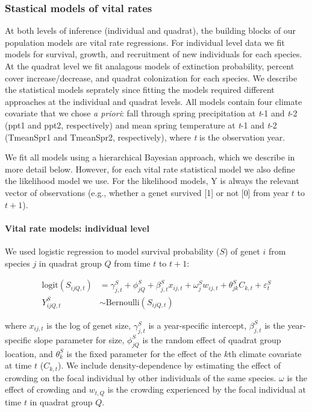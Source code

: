 \documentclass[12pt,]{article}
\begin{document}
\subsubsection{Stastical models of vital
rates}\label{stastical-models-of-vital-rates}

At both levels of inference (individual and quadrat), the building
blocks of our population models are vital rate regressions. For
individual level data we fit models for survival, growth, and
recruitment of new individuals for each species. At the quadrat level we
fit analagous models of extinction probability, percent cover
increase/decrease, and quadrat colonization for each species. We
describe the statistical models seprately since fitting the models
required different approaches at the individual and quadrat levels. All
models contain four climate covariate that we chose \emph{a priori}:
fall through spring precipitation at \emph{t}-1 and \emph{t}-2 (ppt1 and
ppt2, respectively) and mean spring temperature at \emph{t}-1 and
\emph{t}-2 (TmeanSpr1 and TmeanSpr2, respectively), where \emph{t} is
the observation year.

We fit all models using a hierarchical Bayesian approach, which we
describe in more detail below. However, for each vital rate statistical
model we also define the likelihood model we use. For the likelihood
models, Y is always the relevant vector of observations (e.g., whether a
genet survived {[}1{]} or not {[}0{]} from year $t$ to $t+1$).

\paragraph{Vital rate models: individual
level}\label{vital-rate-models-individual-level}

We used logistic regression to model survival probability ($S$) of genet
$i$ from species $j$ in quadrat group $Q$ from time $t$ to $t+1$:

\begin{align}
\text{logit}(S_{ijQ,t}) &= \gamma^{S}_{j,t} + \phi^{S}_{jQ} + \beta^{S}_{j,t}x_{ij,t} + \omega^{S}_{j}w_{ij,t} + \theta^{S}_{jk}C_{k,t} + \varepsilon^{S}_{t} \\
Y^{S}_{ijQ,t} &\sim \text{Bernoulli}(S_{ijQ,t})
\end{align}

where $x_{ij,t}$ is the log of genet size, $\gamma^{S}_{j,t}$ is a
year-specific intercept, $\beta^{S}_{j,t}$ is the year-specific slope
parameter for size, $\phi^{S}_{jQ}$ is the random effect of quadrat
group location, and $\theta^{S}_{k}$ is the fixed parameter for the
effect of the $k$th climate covariate at time $t$ ($C_{k,t}$). We
include density-dependence by estimating the effect of crowding on the
focal individual by other individuals of the same species. $\omega$ is
the effect of crowding and $w_{t,Q}$ is the crowding experienced by the
focal individual at time $t$ in quadrat group $Q$.
\end{document}
